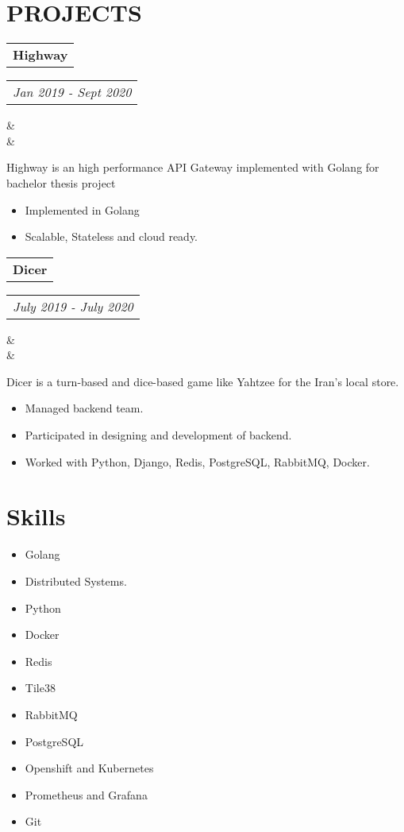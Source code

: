\documentclass[11pt,a4paper,roman]{moderncv}        %
\makeatletter
\newcommand*{\customcvproject}[4][.25em]{
  \begin{tabular}{@{}l}
  {\bfseries #2}
  \end{tabular}
  \hfill%
  \begin{tabular}{l@{}}
  {\itshape #3}
  \end{tabular}
  \ifx&#4&%
  \else{\\%
    \begin{minipage}{\maincolumnwidth}%
      \small#4%
    \end{minipage}}\fi%
  \par\addvspace{#1}}
\makeatother
\begin{document}
  \cleardoublepage
  \section{PROJECTS}\label{sec:projects}
  {
    \customcvproject{Highway}{Jan 2019 - Sept 2020}
    \\ Highway is an high performance API Gateway implemented with Golang for bachelor thesis project\\
    {
      \begin{itemize}
        \item Implemented in Golang
        \item Scalable, Stateless and cloud ready.\\
      \end{itemize}
    }
    \customcvproject{Dicer}{July 2019 - July 2020}
    \\Dicer is a turn-based and dice-based game like Yahtzee for the Iran's local store.\\
    {
      \begin{itemize}
        \item Managed backend team.
        \item Participated in designing and development of backend.
        \item Worked with Python, Django, Redis, PostgreSQL, RabbitMQ, Docker.
      \end{itemize}
    }
  }
  \section{Skills}\label{sec:skills}
  \begin{minipage}{\maincolumnwidth}%
    \small{
      \begin{itemize}
        \item Golang
        \item Distributed Systems.
        \item Python
        \item Docker
        \item Redis
        \item Tile38
        \item RabbitMQ
        \item PostgreSQL
        \item Openshift and Kubernetes
        \item Prometheus and Grafana
        \item Git
      \end{itemize}}%
  \end{minipage}%
\end{document}
